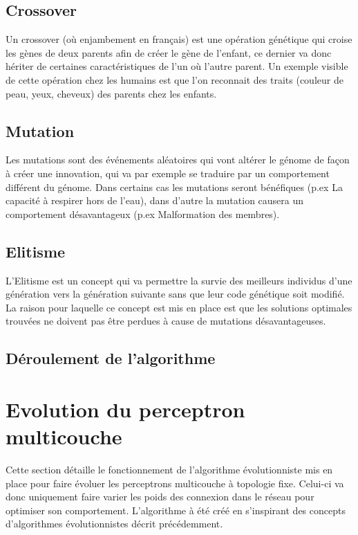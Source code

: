 \documentclass{article}
\begin{document}
\subsection{Crossover}

Un crossover (où enjambement en français) est une opération génétique qui croise les gènes de deux parents afin de créer le gène de l'enfant, ce dernier va donc hériter de certaines caractéristiques de l'un où l'autre parent. Un exemple visible de cette opération chez les humains est que l'on reconnait des traits (couleur de peau, yeux, cheveux) des parents chez les enfants.\cite{wikicrossover}\\

\subsection{Mutation}

Les mutations sont des événements aléatoires qui vont altérer le génome de façon à créer une innovation, qui va par exemple se traduire par un comportement différent du génome. Dans certains cas les mutations seront bénéfiques (p.ex La capacité à respirer hors de l'eau), dans d'autre la mutation causera un comportement désavantageux (p.ex Malformation des membres).\cite{wikimutation}\\

\subsection{Elitisme}

L'Elitisme est un concept qui va permettre la survie des meilleurs individus d'une génération vers la génération suivante sans que leur code génétique soit modifié.\cite{elitism}\\
La raison pour laquelle ce concept est mis en place est que les solutions optimales trouvées ne doivent pas être perdues à cause de mutations désavantageuses.

\subsection{Déroulement de l'algorithme}

\newpage
\section{Evolution du perceptron multicouche}

Cette section détaille le fonctionnement de l'algorithme évolutionniste mis en place pour faire évoluer les perceptrons multicouche à topologie fixe. Celui-ci va donc uniquement faire varier les poids des connexion dans le réseau pour optimiser son comportement. L'algorithme à été créé en s'inspirant des concepts d'algorithmes évolutionnistes décrit précédemment.
\end{document}
